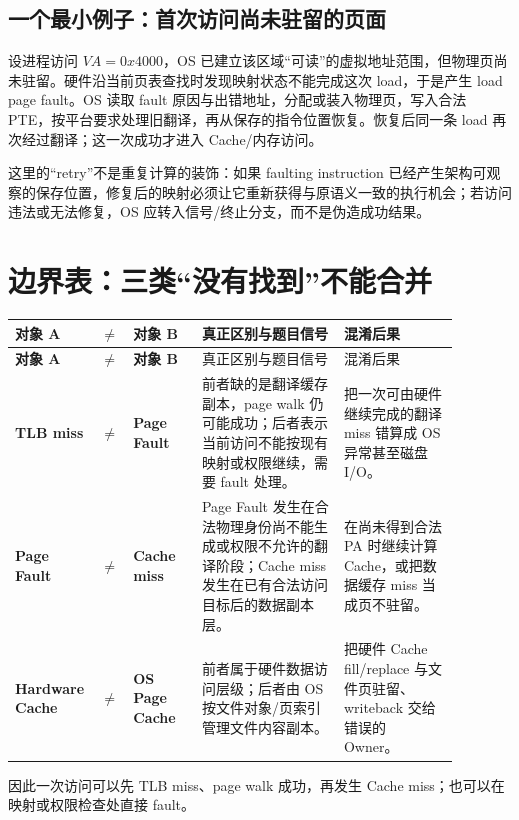 \documentclass[UTF8,fontset=none,11pt,a4paper]{ctexart}
\begin{document}
\subsection{一个最小例子：首次访问尚未驻留的页面}
设进程访问 \(VA=0x4000\)，OS 已建立该区域“可读”的虚拟地址范围，但物理页尚未驻留。硬件沿当前页表查找时发现映射状态不能完成这次 load，于是产生 load page fault。OS 读取 fault 原因与出错地址，分配或装入物理页，写入合法 PTE，按平台要求处理旧翻译，再从保存的指令位置恢复。恢复后同一条 load 再次经过翻译；这一次成功才进入 Cache/内存访问。

这里的“retry”不是重复计算的装饰：如果 faulting instruction 已经产生架构可观察的保存位置，修复后的映射必须让它重新获得与原语义一致的执行机会；若访问违法或无法修复，OS 应转入信号/终止分支，而不是伪造成功结果。

\section{边界表：三类“没有找到”不能合并}
\begingroup
\footnotesize
\renewcommand{\arraystretch}{1.22}
\begin{longtable}{>{\bfseries}p{0.15\linewidth} >{\centering\arraybackslash}p{0.025\linewidth} >{\bfseries}p{0.15\linewidth} p{0.31\linewidth} p{0.25\linewidth}}
\toprule
对象 A & $\neq$ & 对象 B & 真正区别与题目信号 & 混淆后果\\
\midrule
\endfirsthead
\toprule
对象 A & $\neq$ & 对象 B & 真正区别与题目信号 & 混淆后果\\
\midrule
\endhead
TLB miss & $\neq$ & Page Fault & 前者缺的是翻译缓存副本，page walk 仍可能成功；后者表示当前访问不能按现有映射或权限继续，需要 fault 处理。 & 把一次可由硬件继续完成的翻译 miss 错算成 OS 异常甚至磁盘 I/O。\\
Page Fault & $\neq$ & Cache miss & Page Fault 发生在合法物理身份尚不能生成或权限不允许的翻译阶段；Cache miss 发生在已有合法访问目标后的数据副本层。 & 在尚未得到合法 PA 时继续计算 Cache，或把数据缓存 miss 当成页不驻留。\\
Hardware Cache & $\neq$ & OS Page Cache & 前者属于硬件数据访问层级；后者由 OS 按文件对象/页索引管理文件内容副本。 & 把硬件 Cache fill/replace 与文件页驻留、writeback 交给错误的 Owner。\\
\bottomrule
\end{longtable}
\endgroup

因此一次访问可以先 TLB miss、page walk 成功，再发生 Cache miss；也可以在映射或权限检查处直接 fault。
\end{document}
